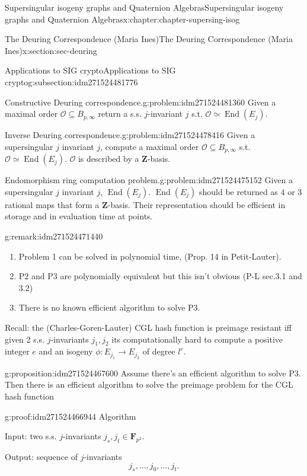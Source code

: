 \documentclass[oneside,10pt,]{book}
\numberwithin{equation}{section}
\newcommand{\ZZ}{\mathbf{Z}}
\newcommand{\FF}{\mathbf{F}}
\newcommand{\ints}{\mathcal{O}}
\DeclareMathOperator{\End}{End}
\begin{document}
\begin{chapterptx}{Supersingular isogeny graphs and Quaternion Algebras}{}{Supersingular isogeny graphs and Quaternion Algebras}{}{}{x:chapter:chapter-supersing-isog}
\begin{sectionptx}{The Deuring Correspondence (Maria Ines)}{}{The Deuring Correspondence (Maria Ines)}{}{}{x:section:sec-deuring}
\begin{subsectionptx}{Applications to SIG crypto}{}{Applications to SIG crypto}{}{}{g:subsection:idm271524481776}
\begin{problem}{Constructive Deuring correspondence.}{g:problem:idm271524481360}
Given a maximal order \(\ints \subseteq B_{p,\infty}\) return a s.s. \(j\)-invariant \(j\) s.t. \(\ints \simeq \End(E_j)\).%
\end{problem}
\begin{problem}{Inverse Deuring correspondence.}{g:problem:idm271524478416}%
Given a supersingular \(j\) invariant \(j\), compute a maximal order \(\ints \subseteq B_{p,\infty}\)  s.t. \(\ints \simeq \End(E_j)\). \(\ints\) is described by a \(\ZZ\)-basis.%
\end{problem}
\begin{problem}{Endomorphism ring computation problem.}{g:problem:idm271524475152}%
Given a supersingular \(j\) invariant \(j\), \(\End(E_j)\). \(\End(E_j)\) should be returned as \(4\) or \(3\) rational maps that form a \(\ZZ\)-basis. Their representation should be efficient in storage and in evaluation time at points.%
\end{problem}
\begin{remark}{}{g:remark:idm271524471440}%
%
\begin{enumerate}
\item{}Problem 1 can be solved in polynomial time, (Prop. 14 in Petit-Lauter).%
\item{}P2 and P3 are polynomially equivalent but this isn't obvious (P-L sec.3.1 and 3.2)%
\item{}There is no known efficient algorithm to solve P3.%
\end{enumerate}
%
\end{remark}
Recall: the (Charles-Goren-Lauter) CGL hash function is preimage resistant iff given 2 s.s. \(j\)-invariants \(j_1,j_2\) its computationally hard to compute a  positive integer \(e\) and an isogeny \(\phi \colon E_{j_1} \to E_{j_2}\) of degree \(l^e\).%
\begin{proposition}{}{}{g:proposition:idm271524467600}%
Assume there's an efficient algorithm to solve P3. Then there is an efficient algorithm to solve the preimage problem for the CGL hash function%
\end{proposition}
\begin{proofptx}{}{g:proof:idm271524466944}
Algorithm%
\par
Input: two s.s. \(j\)-invariants \(j_s,j_t \in \FF_{p^2}\).%
\par
Output: sequence of \(j\)-invariants%
\begin{equation*}
j_s,\ldots,j_0,\ldots, j_t\text{.}
\end{equation*}
%
\par
%
\begin{enumerate}

\end{enumerate}
\end{proofptx}
\end{subsectionptx}
\end{sectionptx}
\end{chapterptx}
\end{document}
